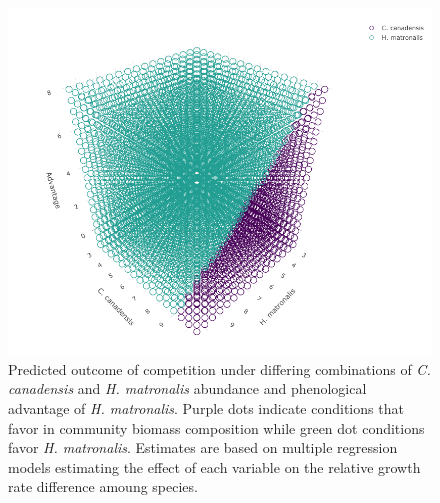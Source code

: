 \documentclass{article}\usepackage[]{graphicx}\usepackage[]{color}
\begin{document}
\begin{figure}[h!]
    \centering
\includegraphics[width=\textwidth]{..//figure/3dconnolly2.png}
   \caption{Predicted outcome of competition under differing combinations of \textit{C. canadensis} and \textit{H. matronalis} abundance and phenological advantage of \textit{H. matronalis}. Purple dots indicate conditions that favor   in community biomass composition while green dot conditions favor \textit{H. matronalis}. Estimates are based on multiple regression models estimating the effect of each variable on the relative growth rate difference amoung species.} 
   \label{fig:3D}
\end{figure}
\end{document}
